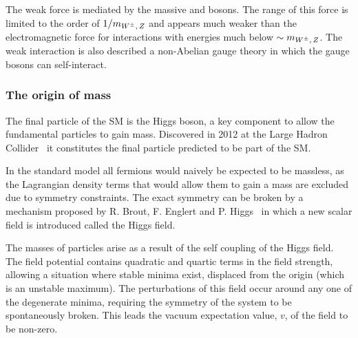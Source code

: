 The weak force is mediated by the massive \Wpm and \Z bosons. The range of this force is limited to the order of $1/m_{{W^\pm},\,{Z}}$ and appears much weaker than the electromagnetic force for interactions with energies much below $\sim m_{{W^\pm},\,{Z}}$. The weak interaction is also described a non-Abelian gauge theory in which the gauge bosons can self-interact. 



\subsubsection{The origin of mass}
The final particle of the SM is the Higgs boson, a key component to allow the fundamental particles to gain mass. Discovered in 2012 at the Large Hadron Collider~\cite{20121,201230} it constitutes the final particle predicted to be part of the SM. 

In the standard model all fermions would naively be expected to be massless, as the Lagrangian density terms that would allow them to gain a mass are excluded due to symmetry constraints. The exact symmetry can be broken by a mechanism proposed by R. Brout, F. Englert and P. Higgs~\cite{PhysRevLett.13.508,PhysRevLett.13.321} in which a new scalar field is introduced called the Higgs field. 

The masses of particles arise as a result of the self coupling of the Higgs field. The field potential contains quadratic and quartic terms in the field strength, allowing a situation where stable minima exist, displaced from the origin (which is an unstable maximum). The perturbations of this field occur around any one of the degenerate minima, requiring the symmetry of the system to be spontaneously broken. This leads the vacuum expectation value, $v$, of the field to be non-zero.   



